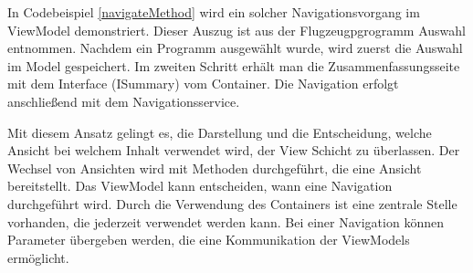 In Codebeispiel \ref{navigateMethod} wird ein solcher Navigationsvorgang im ViewModel demonstriert. Dieser Auszug ist aus der Flugzeugpgrogramm Auswahl entnommen. Nachdem ein Programm ausgewählt wurde, wird zuerst die Auswahl im Model gespeichert. Im zweiten Schritt erhält man die  Zusammenfassungsseite mit dem Interface (ISummary) vom Container. Die Navigation erfolgt anschließend mit dem Navigationsservice.
\par
Mit diesem Ansatz gelingt es, die Darstellung und die Entscheidung, welche Ansicht bei welchem Inhalt verwendet wird, der View Schicht zu überlassen. Der Wechsel von Ansichten wird mit Methoden durchgeführt, die eine Ansicht bereitstellt. Das ViewModel kann entscheiden, wann eine Navigation durchgeführt wird. Durch die Verwendung des Containers ist eine zentrale Stelle vorhanden, die jederzeit verwendet werden kann. Bei einer Navigation können Parameter übergeben werden, die eine Kommunikation der ViewModels ermöglicht. 
 



